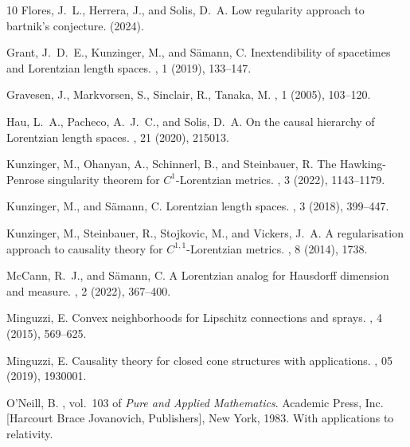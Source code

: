 \documentclass[a4paper,11pt]{article}
\numberwithin{equation}{section}
\theoremstyle{plain}
\theoremstyle{definition}
\begin{document}
\begin{thebibliography}{10}
{\sc Flores, J.~L., Herrera, J., and Solis, D.~A.}
\newblock Low regularity approach to bartnik’s conjecture.
 (2024).

{\sc Grant, J.~D.~E., Kunzinger, M., and S{\"a}mann, C.}
\newblock Inextendibility of spacetimes and {Lorentzian} length spaces.
, 1 (2019), 133--147.

{\sc Gravesen, J., Markvorsen, S., Sinclair, R., Tanaka, M.}
, 1 (2005), 103--120.

{\sc Hau, L.~A., Pacheco, A.~J.~C., and Solis, D.~A.}
\newblock On the causal hierarchy of {Lorentzian} length spaces.
, 21 (2020), 215013.

{\sc Kunzinger, M., Ohanyan, A., Schinnerl, B., and Steinbauer, R.}
\newblock The {H}awking-{P}enrose singularity theorem for {$C^1$}-{L}orentzian
 metrics.
, 3 (2022), 1143--1179.

{\sc Kunzinger, M., and S{\"a}mann, C.}
\newblock Lorentzian length spaces.
, 3 (2018), 399--447.

{\sc Kunzinger, M., Steinbauer, R., Stojkovic, M., and Vickers, J.~A.}
\newblock A regularisation approach to causality theory for
 {$C^{1,1}$}-{Lorentzian} metrics.
, 8 (2014), 1738.

{\sc McCann, R.~J., and S\"amann, C.}
\newblock A {L}orentzian analog for {H}ausdorff dimension and measure.
, 2 (2022), 367--400.

{\sc Minguzzi, E.}
\newblock Convex neighborhoods for {Lipschitz} connections and sprays.
, 4 (2015), 569--625.

{\sc Minguzzi, E.}
\newblock Causality theory for closed cone structures with applications.
, 05 (2019), 1930001.

{\sc O'Neill, B.}
, vol.~103 of {\em Pure and Applied
 Mathematics}.
\newblock Academic Press, Inc. [Harcourt Brace Jovanovich, Publishers], New
 York, 1983.
\newblock With applications to relativity.


\end{thebibliography}
\end{document}
